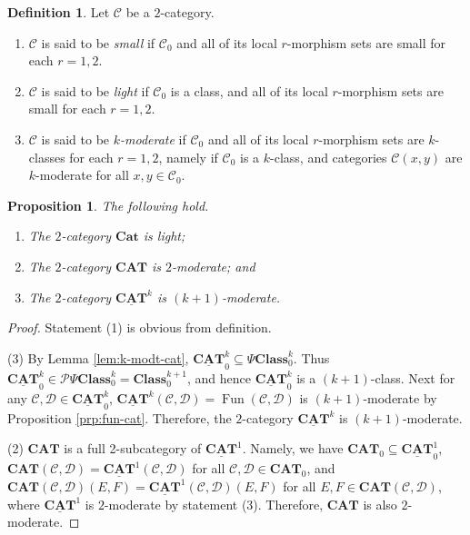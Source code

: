 \documentclass{surv-l}
\numberwithin{equation}{chapter}
\numberwithin{figure}{chapter}
\theoremstyle{plain}
\newtheorem{prp}[thm]{Proposition}
\theoremstyle{definition}
\newtheorem{dfn}[thm]{Definition}
\theoremstyle{remark}
\DeclareMathOperator{\Fun}{Fun}
\begin{document}
\begin{dfn}
Let ${\mathcal{C}}$ be a $2$-category.
\begin{enumerate}
\item
${\mathcal{C}}$ is said to be \emph{small} if
${\mathcal{C}}_0$ and all of its local $r$-morphism sets are small for each $r = 1,2$.
\item
${\mathcal{C}}$ is said to be \emph{light} if
${\mathcal{C}}_0$ is a class, and all of its local $r$-morphism sets
are small for each $r = 1,2$.
\item
${\mathcal{C}}$ is said to be \emph{$k$-moderate} if
${\mathcal{C}}_0$ and all of its local $r$-morphism sets are
$k$-classes for each $r = 1,2$, namely if
${\mathcal{C}}_0$ is a $k$-class, and categories ${\mathcal{C}}(x, y)$ are
$k$-moderate for all $x, y \in {\mathcal{C}}_0$.
\end{enumerate}
\end{dfn}

\begin{prp}\label{prp:2-Cat}
The following hold.
\begin{enumerate}
\item
The $2$-category $\mathbf{Cat}$ is light;
\item
The $2$-category $\mathbf{CAT}$ is $2$-moderate; and
\item
The $2$-category $\underline{\mathbf{CAT}}^k$ is $(k+1)$-moderate.
\end{enumerate}
\end{prp}

\begin{proof}
Statement (1) is obvious from definition.

(3) By Lemma \ref{lem:k-modt-cat}, $\underline{\mathbf{CAT}}^k_0 \subseteq \Psi\mathbf{Class}^k_0$.
Thus $\underline{\mathbf{CAT}}^k_0 \in \mathcal{P}\Psi\mathbf{Class}^k_0 = \mathbf{Class}^{k+1}_0$, and hence
$\underline{\mathbf{CAT}}^k_0$ is a $(k+1)$-class.
Next for any ${\mathcal{C}}, {\mathcal{D}} \in \underline{\mathbf{CAT}}^k_0$,
$\underline{\mathbf{CAT}}^k({\mathcal{C}}, {\mathcal{D}}) = \Fun({\mathcal{C}}, {\mathcal{D}})$ is $(k+1)$-moderate
by Proposition \ref{prp:fun-cat}.
Therefore, the $2$-category $\underline{\mathbf{CAT}}^k$ is $(k+1)$-moderate.

(2) $\mathbf{CAT}$ is a full 2-subcategory of $\underline{\mathbf{CAT}}^1$.
Namely, we have
$\mathbf{CAT}_0 \subseteq \underline{\mathbf{CAT}}^1_0$, $\mathbf{CAT}({\mathcal{C}}, {\mathcal{D}}) = \underline{\mathbf{CAT}}^1({\mathcal{C}}, {\mathcal{D}})$
for all ${\mathcal{C}}, {\mathcal{D}} \in \mathbf{CAT}_0$, and
$\mathbf{CAT}({\mathcal{C}}, {\mathcal{D}})(E, F) = \underline{\mathbf{CAT}}^1({\mathcal{C}}, {\mathcal{D}})(E,F)$
for all $E, F \in \mathbf{CAT}({\mathcal{C}}, {\mathcal{D}})$,
where $\underline{\mathbf{CAT}}^1$ is $2$-moderate by statement (3).
Therefore, $\mathbf{CAT}$ is also $2$-moderate.
\end{proof}
\end{document}
